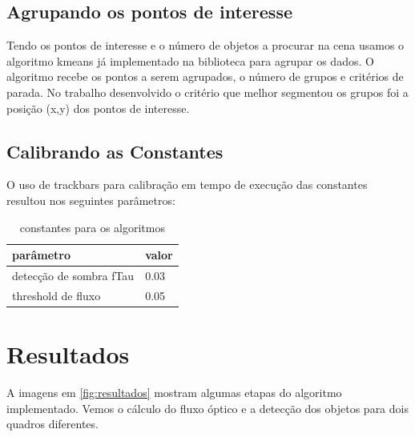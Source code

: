 \documentclass[journal]{IEEEtran}
\begin{document}
\subsection{Agrupando os pontos de interesse}
Tendo os pontos de interesse e o número de objetos a 
procurar na cena usamos o algoritmo kmeans já implementado na 
biblioteca para agrupar os dados. O algoritmo recebe os pontos a 
serem agrupados, o número de grupos e critérios de parada. No 
trabalho desenvolvido o critério que melhor segmentou os grupos foi a 
posição (x,y) dos pontos de interesse.


\subsection{Calibrando as Constantes}
O uso de trackbars para calibração em tempo de execução 
das constantes resultou nos seguintes parâmetros:
\begin{table}[!htp]
\centering
 \begin{tabular}{|l|l|}\hline
 parâmetro & valor \\ \hline
 detecção de sombra fTau & 0.03 \\ \hline
 threshold de fluxo & 0.05 \\ \hline 
 \end{tabular}
\caption{constantes para os algoritmos}
\label{tab:threshold}
\end{table}


\newpage

\section{Resultados}
A imagens em \ref{fig:resultados} mostram algumas etapas do algoritmo
implementado. Vemos o cálculo do fluxo óptico e a detecção dos objetos para
dois quadros diferentes.
\end{document}
